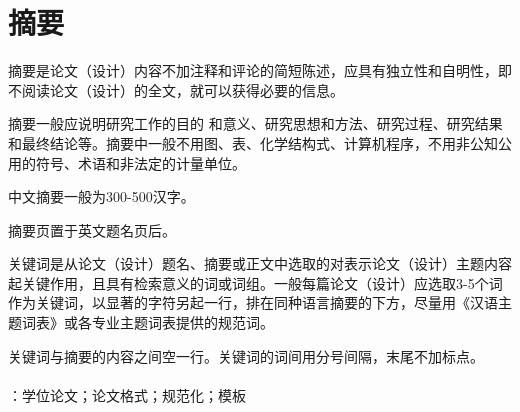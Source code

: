\newpage
\pagestyle{fancy}





\section*{摘\quad 要}

摘要是论文（设计）内容不加注释和评论的简短陈述，应具有独立性和自明性，即不阅读论文（设计）的全文，就可以获得必要的信息。\par 
摘要一般应说明研究工作的目的 和意义、研究思想和方法、研究过程、研究结果和最终结论等。摘要中一般不用图、表、化学结构式、计算机程序，不用非公知公用的符号、术语和非法定的计量单位。\par 
中文摘要一般为300-500汉字。\par 
摘要页置于英文题名页后。 \par 
关键词是从论文（设计）题名、摘要或正文中选取的对表示论文（设计）主题内容起关键作用，且具有检索意义的词或词组。一般每篇论文（设计）应选取3-5个词作为关键词，以显著的字符另起一行，排在同种语言摘要的下方，尽量用《汉语主题词表》或各专业主题词表提供的规范词。\par 
关键词与摘要的内容之间空一行。关键词的词间用分号间隔，末尾不加标点。\\
~\\
：学位论文；论文格式；规范化；模板\\
